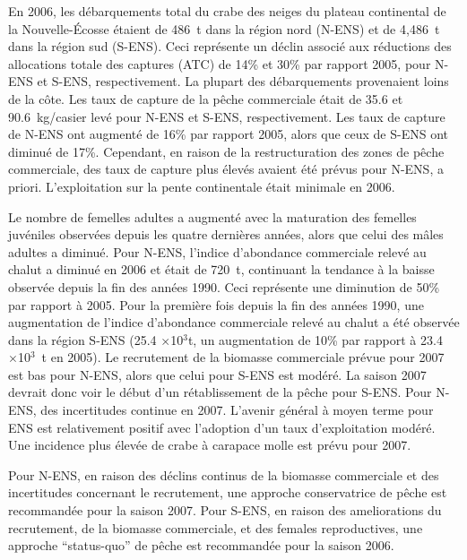 \documentclass[11pt]{article}
\newcommand{\thou}{10$^3$}
\newcommand{\mult}{$\times$}
\begin{document}
En 2006, les d\'{e}barquements total du crabe des neiges du plateau continental de la Nouvelle-\'{E}cosse \'{e}taient de 486~t dans la r\'{e}gion nord (N-ENS) et de 4,486~t dans la r\'{e}gion sud (S-ENS). Ceci repr\'{e}sente un d\'{e}clin associ\'{e} aux r\'{e}ductions des allocations totale des captures (ATC) de 14\% et 30\% par rapport 2005, pour N-ENS et S-ENS, respectivement. La plupart des d\'{e}barquements provenaient loins de la c\^{o}te. Les taux de capture de la p\^{e}che commerciale \'{e}tait de 35.6 et 90.6~kg/casier lev\'{e} pour N-ENS et S-ENS, respectivement. Les taux de capture de N-ENS ont augment\'{e} de 16\% par rapport 2005, alors que ceux de S-ENS ont diminu\'{e} de 17\%. Cependant, en raison de la restructuration des zones de p\^{e}che commerciale, des taux de capture plus \'{e}lev\'{e}s avaient \'{e}t\'{e} pr\'{e}vus pour N-ENS, a priori. L'exploitation sur la pente continentale \'{e}tait minimale en 2006.

Le nombre de femelles adultes a augment\'{e} avec la maturation des femelles juv\'{e}niles observ\'{e}es depuis les quatre derni\`{e}res ann\'{e}es, alors que celui des m\^{a}les adultes a diminu\'{e}. Pour N-ENS, l'indice d'abondance commerciale relev\'{e} au chalut a diminu\'{e} en 2006 et \'{e}tait de 720~t, continuant la tendance \`{a} la baisse observ\'{e}e depuis la fin des ann\'{e}es 1990. Ceci repr\'{e}sente une diminution de 50\% par rapport \`{a} 2005. Pour la premi\`{e}re fois depuis la fin des ann\'{e}es 1990, une augmentation de l'indice d'abondance commerciale relev\'{e} au chalut a \'{e}t\'{e} observ\'{e}e dans la r\'{e}gion S-ENS (25.4 \mult \thou t, un augmentation de 10\% par rapport \`{a} 23.4~ \mult \thou ~t en 2005). Le recrutement de la biomasse commerciale pr\'{e}vue pour 2007 est bas pour N-ENS, alors que celui pour S-ENS est mod\'{e}r\'{e}. La saison 2007 devrait donc voir le d\'{e}but d'un r\'{e}tablissement de la p\^{e}che pour S-ENS. Pour N-ENS, des incertitudes continue en 2007. L'avenir g\'{e}n\'{e}ral \`{a} moyen terme pour ENS est relativement positif avec l'adoption d'un taux d'exploitation mod\'{e}r\'{e}. Une incidence plus \'{e}lev\'{e}e de crabe \`{a} carapace molle est pr\'{e}vu pour 2007. 

Pour N-ENS, en raison des d\'{e}clins continus de la biomasse commerciale et des incertitudes concernant le recrutement, une approche conservatrice de p\^{e}che est recommand\'{e}e pour la saison 2007. Pour S-ENS, en raison des ameliorations du recrutement, de la biomasse commerciale, et des females reproductives, une approche ``status-quo'' de p\^{e}che est recommand\'{e}e pour la saison 2006.
\end{document}
